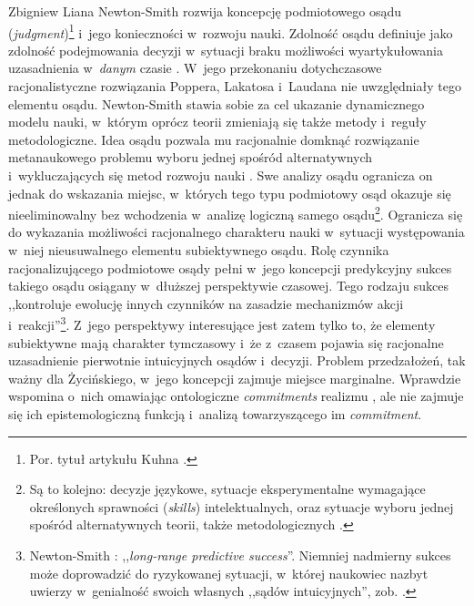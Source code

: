 \begin{artplenv}{Zbigniew Liana}
Newton-Smith
\parencite*[][]{newton-smith_rationality_1981} %
 rozwija koncepcję podmiotowego osądu (\textit{judgment})\footnote{Por. tytuł artykułu Kuhna 
\parencite*[][]{kuhn_objectivity_1977}.%
} i~jego konieczności w~rozwoju nauki. Zdolność osądu definiuje jako zdolność podejmowania decyzji w~sytuacji braku możliwości wyartykułowania uzasadnienia w~\textit{danym} czasie 
\parencite[][s.~234]{newton-smith_rationality_1981}. %
 W~jego przekonaniu dotychczasowe racjonalistyczne rozwiązania Poppera, Lakatosa i~Laudana nie uwzględniały tego elementu osądu. Newton-Smith stawia sobie za cel ukazanie dynamicznego modelu nauki, w~którym oprócz teorii zmieniają się także metody i~reguły metodologiczne. Idea osądu pozwala mu racjonalnie domknąć rozwiązanie metanaukowego problemu wyboru jednej spośród alternatywnych i~wykluczających się metod rozwoju nauki 
\parencite[][s.~270]{newton-smith_rationality_1981}. %
 Swe analizy osądu ogranicza on jednak do wskazania miejsc, w~których tego typu podmiotowy osąd okazuje się nieeliminowalny bez wchodzenia w~analizę logiczną samego osądu\footnote{Są to kolejno: decyzje językowe, sytuacje eksperymentalne wymagające określonych sprawności (\textit{skills}) intelektualnych, oraz sytuacje wyboru jednej spośród alternatywnych teorii, także metodologicznych 
\parencite[zob.][s.~232–235]{newton-smith_rationality_1981}.%
}. Ogranicza się do wykazania możliwości racjonalnego charakteru nauki w~sytuacji występowania w~niej nieusuwalnego elementu subiektywnego osądu. Rolę czynnika racjonalizującego podmiotowe osądy pełni w~jego koncepcji predykcyjny sukces takiego osądu osiągany w~dłuższej perspektywie czasowej. Tego rodzaju sukces ,,kontroluje ewolucję innych czynników na zasadzie mechanizmów akcji i~reakcji''\footnote{Newton-Smith 
\parencite*[][s.~270]{newton-smith_rationality_1981}: %
 ,,\textit{long-range predictive success}''. Niemniej nadmierny sukces może doprowadzić do ryzykowanej sytuacji, w~której naukowiec nazbyt uwierzy w~genialność swoich własnych ,,sądów intuicyjnych'', zob. 
\parencite[][s.~234n]{newton-smith_rationality_1981}.%
}. Z~jego perspektywy interesujące jest zatem tylko to, że elementy subiektywne mają charakter tymczasowy i~że z~czasem pojawia się racjonalne uzasadnienie pierwotnie intuicyjnych osądów i~decyzji. Problem przedzałożeń, tak ważny dla Życińskiego, w~jego koncepcji zajmuje miejsce marginalne. Wprawdzie wspomina o~nich omawiając ontologiczne \textit{commitments} realizmu 
\parencite[][s.~38]{newton-smith_rationality_1981}, %
 ale nie zajmuje się ich epistemologiczną funkcją i~analizą towarzyszącego im \textit{commitment}.


\end{artplenv}
